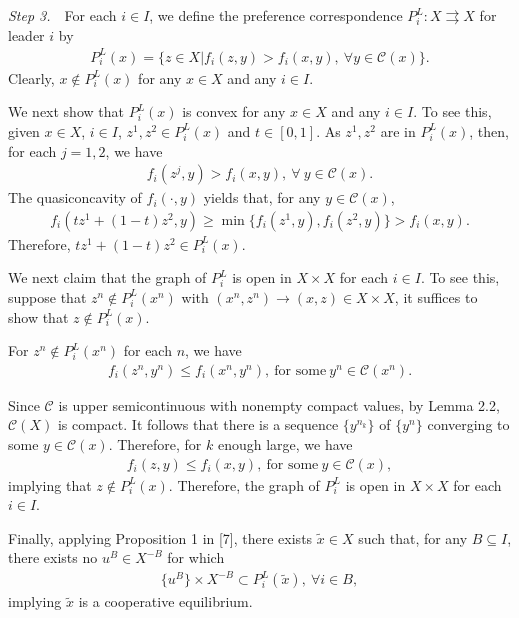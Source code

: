 {\it Step 3.}~~For each $i\in I$, we define the preference correspondence
$P^L_i:X\rightrightarrows X$ for leader $i$ by
\begin{eqnarray*}
P^L_i(x)=\{z\in X|f_i(z,y)>f_i(x,y),\ \forall y\in \mathcal{C}(x)\}.
\end{eqnarray*}
Clearly, $x\not\in P^L_i(x)$ for any $x\in X$ and any $i\in I$.

We next show that $P^L_i(x)$ is convex for any $x\in X$ and any $i\in I$.
To see this, given $x\in X$, $i\in I$, $z^1,z^2\in P^L_i(x)$ and $t\in [0,1]$.
As $z^1,z^2$ are in $P^L_i(x)$, then, for each $j=1,2$, we have
\begin{eqnarray*}
f_i(z^j,y)> f_i(x,y),\ \forall\ y\in \mathcal{C}(x).
\end{eqnarray*}
The quasiconcavity of $f_i(\cdot,y)$ yields that, for any $y\in \mathcal{C}(x)$,
\begin{eqnarray*}
f_i(tz^1+(1-t)z^2,y)\geq\min\{f_i(z^1,y),f_i(z^2,y)\}> f_i(x,y).
\end{eqnarray*}
Therefore, $tz^1+(1-t)z^2\in P^L_i(x)$.


We next claim that the graph of $P^L_i$ is open in $X\times X$ for each $i\in I$.
To see this, suppose that $z^n\not \in P^L_i(x^n)$ with
$(x^n,z^n)\longrightarrow (x,z)\in X\times X$,
it suffices to show that $z\not \in P^L_i(x)$.

For $z^n\not \in P^L_i(x^n)$ for each $n$, we have
\begin{eqnarray*}
f_i(z^n,y^n)\leq f_i(x^n,y^n),\ \mbox{for\ some}\ y^n\in \mathcal{C}(x^n).
\end{eqnarray*}

Since $\mathcal{C}$ is upper semicontinuous
with nonempty compact values, by Lemma 2.2, $\mathcal{C}(X)$ is compact.
It follows that there is a sequence $\{y^{n_k}\}$ of $\{y^n\}$
converging to some  $y \in \mathcal{C}(x)$.
Therefore, for $k$ enough large, we have
\begin{eqnarray*}
f_i(z,y)\leq f_i(x,y),\ \mbox{for\ some}\ y\in \mathcal{C}(x),
\end{eqnarray*}
implying that $z\not \in P^L_i(x)$. Therefore,
the graph of $P^L_i$ is open in $X\times X$ for each $i\in I$.

Finally, applying Proposition 1 in [7], there exists $\widetilde{x}\in X$
such that, for any $B\subseteq I$, there exists no $u^B\in X^{-B}$ for which
\begin{eqnarray*}
\{u^B\}\times X^{-B}\subset P^L_i(\widetilde{x}),\ \forall i\in B,
\end{eqnarray*}
implying $\widetilde{x}$ is a cooperative equilibrium.
\\

